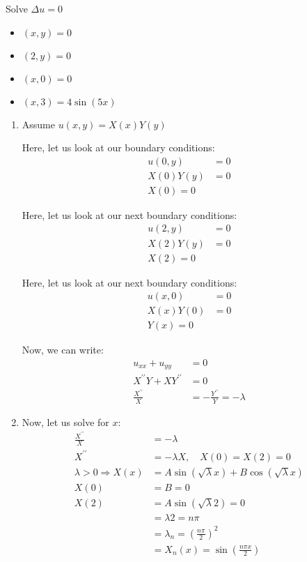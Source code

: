 \ex Solve $\Delta u = 0$
%
\begin{itemize}
  \item $(x, y) = 0$
  \item $(2, y) = 0$
  \item $(x, 0) = 0$
  \item $(x, 3) = 4 \sin (5x)$
\end{itemize}
%
\begin{enumerate}
  \item Assume $u(x, y) = X(x)Y(y)$

  Here, let us look at our boundary conditions:
  \begin{align}
    u(0, y) & = 0\\
    X(0)Y(y) & = 0\\
    X(0) = 0
  \end{align}

  Here, let us look at our next boundary conditions:
  \begin{align}
    u(2, y) & = 0\\
    X(2)Y(y) & = 0\\
    X(2) = 0
  \end{align}

  Here, let us look at our next boundary conditions:
  \begin{align}
    u(x, 0) & = 0\\
    X(x)Y(0) & = 0\\
    Y(x) = 0
  \end{align}

  Now, we can write:
  \begin{align}
    u_{xx} + u_{yy} & = 0\\
    X^{\prime\prime}Y + XY^{\prime\prime} & = 0\\
    \frac{X^{\prime\prime}}{X} & = -\frac{Y^{\prime\prime}}{Y} = - \lambda
  \end{align}
  \item Now, let us solve for $x$:
  \begin{align}
    \frac{X^{\prime\prime}}{X} & = -\lambda\\
    X^{\prime\prime} & = - \lambda X, \quad X(0) = X(2) = 0\\
    \lambda > 0 \Rightarrow X(x)
    & = A \sin(\sqrt \lambda x) + B \cos(\sqrt \lambda x)\\
    X(0) & = B = 0\\
    X(2) & = A \sin(\sqrt \lambda 2) = 0\\
    & = \lambda 2 = n \pi\\
    & = \lambda_n = \left( \frac{n \pi}{2} \right)^2\\
    & = X_n(x) =  \sin(\frac{n \pi x}{2})
  \end{align}


\end{enumerate}
